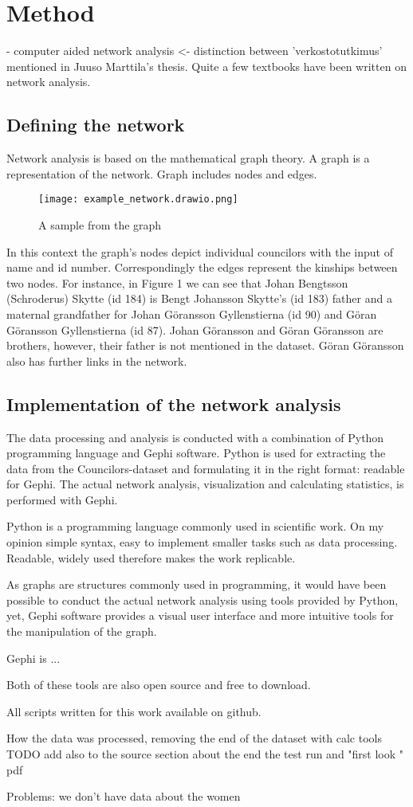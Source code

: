\documentclass[a4paper,12pt]{article}
\begin{document}
\section{Method}
- computer aided network analysis <- distinction between 'verkostotutkimus' mentioned in Juuso Marttila's thesis. 
Quite a few textbooks have been written on network analysis.

\subsection{Defining the network}
Network analysis is based on the mathematical graph theory. A graph is a representation of the network. Graph includes nodes and edges.

\begin{figure}[h]
	\caption{A sample from the graph} 
	\centering
	\texttt{[image: example\_network.drawio.png]}
	\centering	
\end{figure}
In this context the graph's nodes depict individual councilors with the input of name and id number. Correspondingly the edges represent the kinships between two nodes. For instance, in Figure 1 we can see that Johan Bengtsson (Schroderus) Skytte (id 184) is Bengt Johansson Skytte's (id 183) father and a maternal grandfather for Johan Göransson Gyllenstierna (id 90) and Göran Göransson Gyllenstierna (id 87). Johan Göransson and Göran Göransson are brothers, however, their father is not mentioned in the dataset. Göran Göransson also has further links in the network.  

\subsection{Implementation of the network analysis}
The data processing and analysis is conducted with a combination of Python programming language and Gephi software. Python is used for extracting the data from the Councilors-dataset and formulating it in the right format: readable for Gephi. The actual network analysis, visualization and calculating statistics, is performed with Gephi. 

Python is a programming language commonly used in scientific work.
On my opinion simple syntax, easy to implement smaller tasks such as data processing. Readable, widely used therefore makes the work replicable. 

As graphs are structures commonly used in programming, it would have been possible to conduct the actual network analysis using tools provided by Python, yet, Gephi software provides a visual user interface and more intuitive tools for the manipulation of the graph.

Gephi is ...

Both of these tools are also open source and free to download.

All scripts written for this work available on github.

How the data was processed, removing the end of the dataset with calc tools TODO add also to the source section about the end
the test run and "first look " pdf

Problems: we don't have data about the women
\end{document}
